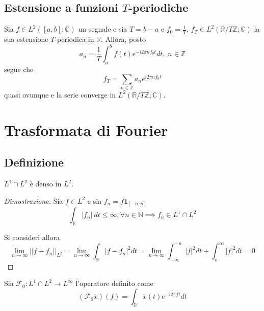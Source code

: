     \subsection{Estensione a funzioni $T$-periodiche}
        \begin{theorem}\label{thm:fourier_series}
            Sia $f \in L^2([a, b]; \mathbb{C})$ un segnale e sia $T = b - a$ e $f_0 = \frac{1}{T}$, $f_T \in L^2(\mathbb{R}/T\mathbb{Z}; \mathbb{C})$ la sua estensione $T$-periodica in $\mathbb{R}$.
            Allora, posto
            \[
                a_n = \frac{1}{T} \int_{a}^{b} f(t) e^{-i 2 \pi n f_0 t} dt, \; n \in \mathbb{Z}
            \]
            segue che
            \[
                f_T = \sum_{n \in \mathbb{Z}} a_n e^{i 2 \pi n f_0 t} 
            \]
            quasi ovunque e la serie converge in $L^2(\mathbb{R}/T\mathbb{Z}; \mathbb{C})$.
        \end{theorem}


\clearpage
\section{Trasformata di Fourier}
    \subsection{Definizione}
        \begin{lemma}
            $L^1 \cap L^2$ è denso in $L^2$.
        \end{lemma}

        \begin{proof}[Dimostrazione]
            Sia $f \in L^2$ e sia $f_{n} = f \mathbf{1}_{[-n, n]}$
            \[
                \int_{\mathbb{R}} \left| f_{n} \right| \: dt \leq \infty, \forall n \in \mathbb{N} \implies f_{n} \in L^1 \cap L^2
            \]

            Si consideri allora
            \[
                \lim_{n \rightarrow \infty} ||f - f_{n}||_{L^2} = \lim_{n \rightarrow \infty} \int_{\mathbb{R}} |f - f_{n}|^2 dt = \lim_{n \rightarrow \infty} \int_{-\infty}^{-n} |f|^2 dt + \int_{n}^{\infty} |f|^2 dt = 0
            \]
        \end{proof}

        \begin{definition}
            Sia $\mathcal{F}_0: L^1 \cap L^2 \rightarrow L^{\infty}$ l'operatore definito come
            \[
                (\mathcal{F}_0 x) (f) = \int_{\mathbb{R}} x(t) e^{-i 2 \pi f t} dt
            \]
        \end{definition}

